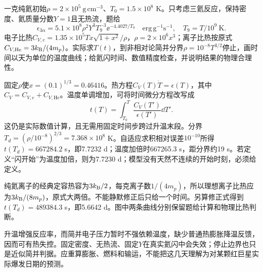 \begin{exercise}
一克纯氦初始$\rho=2\times10^5\ \mathrm{g\,cm^{-3}}$、$T_0=1.5\times10^8$ K。只考虑三氦反应，保持密度、氦质量分数$Y=1$且无热流，题给
\[
 \epsilon_{3\alpha}=5.1\times10^8\rho^2Y^3T_9^{-3}\ee^{-4.4027/T_9}
 \quad\mathrm{erg\,g^{-1}s^{-1}},\quad T_9=T/10^9\ \mathrm K.
\]
电子比热$C_{V,e}=1.35\times10^5T x\sqrt{1+x^2}/\rho$，$\rho=2\times10^6x^3$；离子比热按原式$C_{V,\mathrm{He}}=3k_{\mathrm B}/(4m_p)$。实际求$T(t)$，到非相对论简并分界$\rho=10^{-8}T^{3/2}$停止，画时间以天为单位的温度曲线；给氦闪时间、数值精度检查，并说明结果的物理合理性。
\end{exercise}
\begin{solution}
固定$\rho$使$x=(0.1)^{1/3}=0.46416$。热方程$C_V(T)\dot T=\epsilon(T)$，其中$C_V=C_{V,e}+C_{V,\mathrm{He}}$。温度单调增加，可将时间微分方程改写成
\[
 t(T)=\int_{T_0}^T\frac{C_V(T')}{\epsilon(T')}\dd T'.
\]
这仍是实际数值计算，且无需用固定时间步跨过升温末段。分界$T_d=(\rho/10^{-8})^{2/3}=7.368\times10^8$ K。自适应求积相对误差$10^{-10}$所得$t(T_d)=667284.2$ s，即7.7232 d；温度加倍时667265.3 s，距分界约19 s。若定义“闪开始”为温度加倍，则为7.7230 d；模型没有天然不连续的开始时刻，必须给定义。
\begin{center}\end{center}
纯氦离子的经典定容热容为$3k_{\mathrm B}/2$，每克离子数$1/(4m_p)$，所以理想离子比热应为$3k_{\mathrm B}/(8m_p)$，原式大两倍。不能静默修正后只给一个时间。另算修正式得到$t(T_d)=489384.3$ s，即5.6642 d。图中两条曲线分别保留题给计算和物理比热判断。

升温增强反应率，而简并电子压力暂时不强依赖温度，缺少普通热膨胀降温反馈，因而可有热失控。固定密度、无热流、固定$Y$在真实氦闪中会失效；停止边界也只是近似简并判据。应重算膨胀、燃料和输运，不能把这几天理解为对某颗红巨星实际爆发日期的预测。
\end{solution}

